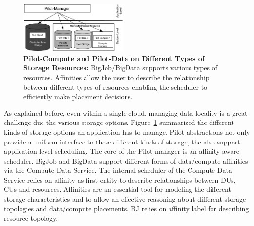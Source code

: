 \documentclass[times]{cpeauth}
\newcommand{\pilot}{Pilot\xspace}
\newcommand{\computedataservice}{Compute-Data Service\xspace}
\newcommand{\dus}{DUs\xspace}
\newcommand{\cus}{CUs\xspace}
\begin{document}
% 


\begin{figure}
	\centering
		\includegraphics[width=0.48\textwidth]{figures/storage-types.pdf}
                \caption{\textbf{Pilot-Compute and Pilot-Data on Different
                                Types of Storage Resources:} BigJob/BigData 
				supports various types of resources. Affinities allow the user 
				to describe the 
				relationship between different types of resources enabling the 
				scheduler to efficiently make placement decisions. }
	\label{fig:figures_storage-types}
\end{figure}

As explained before, even within a single cloud, managing data locality is a
great challenge due the various storage options.
Figure~\ref{fig:figures_storage-types} summarized the different kinds of
storage options an application has to manage. \pilot-abstractions not only
provide a uniform interface to these different kinds of storage, the also
support application-level scheduling. The core of the \pilot-manager is an
affinity-aware scheduler. BigJob and BigData support different forms of
data/compute affinities via the \computedataservice. The internal scheduler of
the \computedataservice relies on affinity as first entity to describe
relationships between \dus, \cus and resources. Affinities are an essential
tool for modeling the different storage characteristics and to allow an
effective reasoning about different storage topologies and data/compute
placements. BJ relies on affinity label for describing resource topology.
\end{document}
